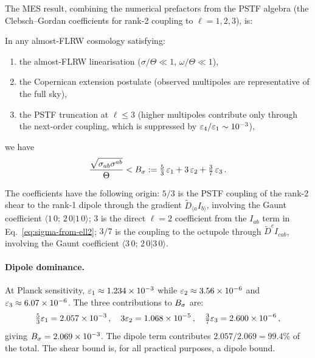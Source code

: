 The MES result, combining the numerical prefactors from the
PSTF algebra (the Clebsch--Gordan coefficients for rank-2
coupling to $\ell = 1, 2, 3$), is:

\begin{theorem}\label{thm:MES-shear}
In any almost-FLRW cosmology satisfying:
\begin{enumerate}
\item[\emph{(A1)}] the almost-FLRW linearisation
  ($\sigma/\Theta \ll 1$, $\omega/\Theta \ll 1$),
\item[\emph{(A2)}] the Copernican extension postulate
  (observed multipoles are representative of the full sky),
\item[\emph{(A3)}] the PSTF truncation at $\ell \leq 3$
  (higher multipoles contribute only through the next-order
  coupling, which is suppressed by $\varepsilon_4/\varepsilon_1
  \sim 10^{-3}$),
\end{enumerate}
we have
\begin{equation}\label{eq:Bsig-def}
\frac{\sqrt{\sigma_{ab}\sigma^{ab}}}{\Theta}
< B_\sigma
:= \tfrac{5}{3}\,\varepsilon_1 + 3\,\varepsilon_2 + \tfrac{3}{7}\,\varepsilon_3\,.
\end{equation}
\end{theorem}

The coefficients have the following origin:
$5/3$ is the PSTF coupling of the rank-2 shear to the
rank-1 dipole through the gradient
$\tilde{D}_{\langle a}I_{b\rangle}$, involving the
Gaunt coefficient $\langle 1\,0;\,2\,0|1\,0\rangle$;
$3$ is the direct $\ell = 2$ coefficient from the
$I_{ab}$ term in Eq.~\eqref{eq:sigma-from-ell2};
$3/7$ is the coupling to the octupole through
$\tilde{D}^c I_{cab}$, involving the Gaunt coefficient
$\langle 3\,0;\,2\,0|3\,0\rangle$.

\paragraph{Dipole dominance.}
At Planck sensitivity, $\varepsilon_1 \approx 1.234 \times 10^{-3}$
while $\varepsilon_2 \approx 3.56 \times 10^{-6}$ and
$\varepsilon_3 \approx 6.07 \times 10^{-6}$.  The three contributions
to $B_\sigma$ are:
\begin{equation}\label{eq:dipole-dominance}
\tfrac{5}{3}\varepsilon_1 = 2.057 \times 10^{-3}\,,\quad
3\varepsilon_2 = 1.068 \times 10^{-5}\,,\quad
\tfrac{3}{7}\varepsilon_3 = 2.600 \times 10^{-6}\,,
\end{equation}
giving $B_\sigma = 2.069 \times 10^{-3}$.  The dipole term
contributes $2.057/2.069 = 99.4\%$ of the total.  The shear
bound is, for all practical purposes, a dipole bound.


